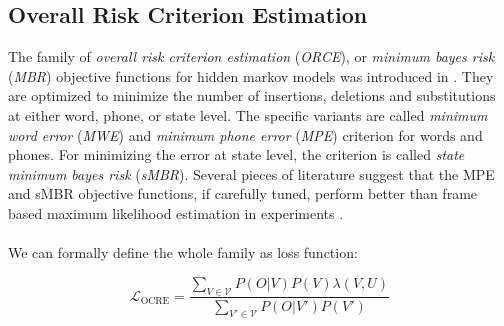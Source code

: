 \subsection{Overall Risk Criterion Estimation}
\label{sec:ocre}
The family of \textit{overall risk criterion estimation} (\textit{ORCE}), or \textit{minimum bayes risk} (\textit{MBR}) objective functions for hidden markov models was introduced in \cite{kaiser2000novel}. They are optimized to minimize the number of insertions, deletions and substitutions at either word, phone, or state level. The specific variants are called \textit{minimum word error} (\textit{MWE}) and \textit{minimum phone error} (\textit{MPE}) criterion for words and phones. For minimizing the error at state level, the criterion is called \textit{state minimum bayes risk} (\textit{sMBR}). Several pieces of literature suggest that the MPE and sMBR objective functions, if carefully tuned, perform better than frame based maximum likelihood estimation in experiments \cite{povey2002minimum}\cite{gibson2008minimum}\cite{povey2005discriminative}\cite{peddinti2015jhu}. \\ \\
We can formally define the whole family as loss function: 

\[
\mathcal{L}_{\text{OCRE}} = \frac{\sum_{V \in \mathcal{V}} P(O|V)P(V) \lambda(V,U)}{\sum_{V' \in \mathcal{V}} P(O|V')P(V')} 
\]

